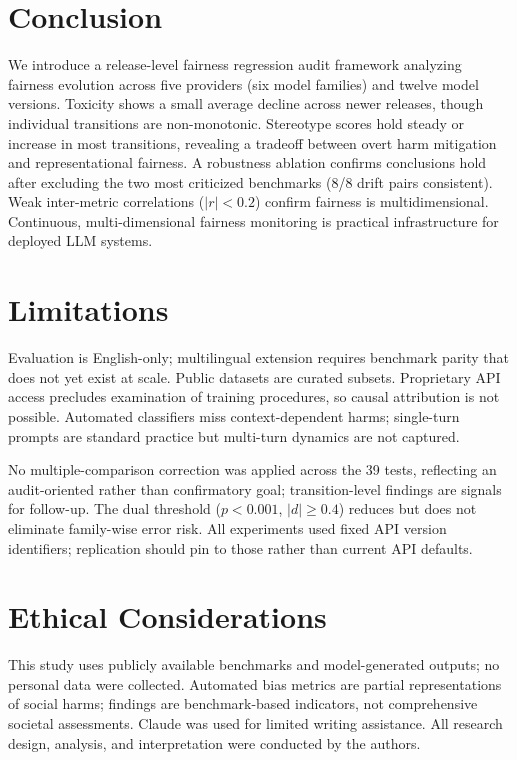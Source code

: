 \documentclass[11pt]{article}
\begin{document}
\section{Conclusion}

We introduce a release-level fairness regression audit framework analyzing fairness evolution across five providers (six model families) and twelve model versions. Toxicity shows a small average decline across newer releases, though individual transitions are non-monotonic. Stereotype scores hold steady or increase in most transitions, revealing a tradeoff between overt harm mitigation and representational fairness. A robustness ablation confirms conclusions hold after excluding the two most criticized benchmarks (8/8 drift pairs consistent). Weak inter-metric correlations ($|r| < 0.2$) confirm fairness is multidimensional. Continuous, multi-dimensional fairness monitoring is practical infrastructure for deployed LLM systems.

\section*{Limitations}

Evaluation is English-only; multilingual extension requires benchmark parity that does not yet exist at scale. Public datasets are curated subsets. Proprietary API access precludes examination of training procedures, so causal attribution is not possible. Automated classifiers miss context-dependent harms; single-turn prompts are standard practice but multi-turn dynamics are not captured.

No multiple-comparison correction was applied across the 39 tests, reflecting an audit-oriented rather than confirmatory goal; transition-level findings are signals for follow-up. The dual threshold ($p < 0.001$, $|d| \geq 0.4$) reduces but does not eliminate family-wise error risk. All experiments used fixed API version identifiers; replication should pin to those rather than current API defaults.

\section*{Ethical Considerations}

This study uses publicly available benchmarks and model-generated outputs; no personal data were collected. Automated bias metrics are partial representations of social harms; findings are benchmark-based indicators, not comprehensive societal assessments. Claude was used for limited writing assistance. All research design, analysis, and interpretation were conducted by the authors.
\end{document}
